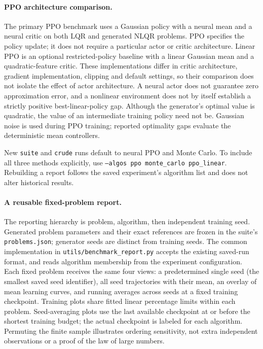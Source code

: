 \documentclass[11pt]{article}
\begin{document}
\paragraph{PPO architecture comparison.}
The primary PPO benchmark uses a Gaussian policy with a neural mean and a neural
critic on both LQR and generated NLQR problems. PPO specifies the policy update;
it does not require a particular actor or critic architecture. Linear PPO is an
optional restricted-policy baseline with a linear Gaussian mean and a
quadratic-feature critic. These implementations differ in critic architecture,
gradient implementation, clipping and default settings, so their comparison does
not isolate the effect of actor architecture. A neural actor does not guarantee
zero approximation error, and a nonlinear environment does not by itself establish
a strictly positive best-linear-policy gap. Although the generator's optimal
value is quadratic, the value of an intermediate training policy need not be.
Gaussian noise is used during PPO training; reported optimality gaps evaluate
the deterministic mean controllers.

New \texttt{suite} and \texttt{crude} runs default to neural PPO and Monte Carlo.
To include all three methods explicitly, use
\texttt{--algos ppo monte\_carlo ppo\_linear}. Rebuilding a report follows the
saved experiment's algorithm list and does not alter historical results.

\paragraph{A reusable fixed-problem report.}
The reporting hierarchy is problem, algorithm, then independent training seed.
Generated problem parameters and their exact references are frozen in the suite's
\texttt{problems.json}; generator seeds are distinct from training seeds.
The common implementation in \texttt{utils/benchmark\_report.py} accepts the
existing saved-run format, and reads algorithm membership from the experiment
configuration. Each fixed problem receives the same four views: a predetermined
single seed (the smallest saved seed identifier), all seed trajectories with their
mean, an overlay of mean learning curves, and running averages across seeds at a
fixed training checkpoint. Training plots share fitted linear percentage limits
within each problem. Seed-averaging plots use the last available checkpoint at or
before the shortest training budget; the actual checkpoint is labeled for each
algorithm. Permuting the finite sample illustrates ordering sensitivity, not extra
independent observations or a proof of the law of large numbers.
\end{document}

